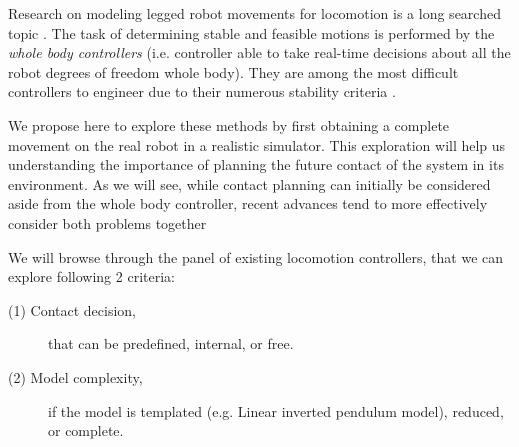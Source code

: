 
Research on modeling legged robot movements for locomotion is a long searched topic \cite{history_humanoid_robots}.
The task of determining stable and feasible motions is performed by the \textit{whole body controllers} (i.e. controller able to take real-time decisions about all the robot degrees of freedom whole body). They are among the most difficult controllers to engineer due to their numerous stability criteria \cite{chevallereau_book, kajita_intro_humanoid_robotics}.


We propose here to explore these methods by first obtaining a complete movement on the real robot in a realistic simulator.
This exploration will help us understanding the importance of planning the future contact of the system in its environment.
As we will see, while contact planning can initially be considered aside from the whole body controller, recent advances tend to more effectively consider both problems together

We will browse through the panel of existing locomotion controllers, that we can explore following 2 criteria:
\begin{description}
   \item[(1) Contact decision,] that can be predefined, internal, or free.
   \item[(2) Model complexity,] if the model is templated (e.g. Linear inverted pendulum model), reduced, or complete.
\end{description}

